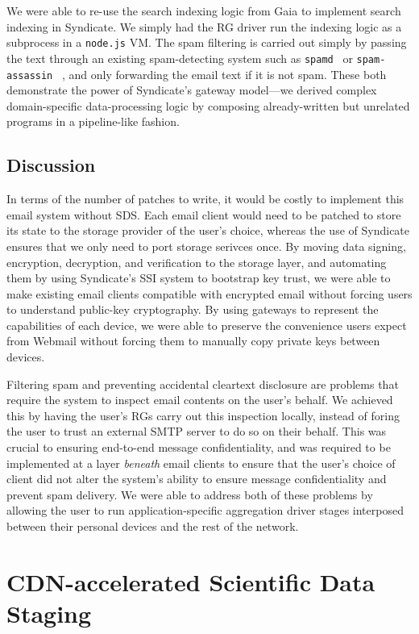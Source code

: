 We were able to re-use the search indexing
logic from Gaia to implement search indexing in Syndicate.  We simply had the RG
driver run the indexing logic as a subprocess in a \texttt{node.js} VM.  The
spam filtering is carried out simply by passing the text through an existing
spam-detecting system such as \texttt{spamd}~\cite{spamd} or \texttt{spam-assassin}
~\cite{spam-assassin}, and only forwarding the email text if it is not spam.
These both demonstrate the power of Syndicate's gateway model---we 
derived complex domain-specific data-processing logic by composing
already-written but unrelated programs in a pipeline-like fashion.

\subsection{Discussion}

In terms of the number of patches to write, it would be costly to implement this email system without
SDS.  Each email client would need to be patched to store its state to the
storage provider of the user's choice, whereas the use of Syndicate ensures that
we only need to port storage serivces once.  By moving data signing,
encryption, decryption, and verification to the storage layer, and automating
them by using Syndicate's SSI system to bootstrap key trust, we were able to
make existing email clients compatible with encrypted email without forcing
users to understand public-key cryptography.  By using gateways to represent the
capabilities of each device, we were able to preserve the convenience users expect from Webmail
without forcing them to manually copy private keys between devices.

Filtering spam and preventing accidental cleartext disclosure are problems
that require the system to inspect email contents on the user's behalf.  We
achieved this by having the user's RGs carry out this inspection locally,
instead of foring the user to trust an external SMTP server to do so on their
behalf.  This was crucial to ensuring end-to-end message confidentiality, and
was required to be implemented at a layer \emph{beneath} email clients to ensure
that the user's choice of client did not alter the system's ability to ensure
message confidentiality and prevent spam delivery.  We were able
to address both of these problems by
allowing the user to run application-specific aggregation driver
stages interposed between their personal devices and the rest of the network.

\section{CDN-accelerated Scientific Data Staging}

